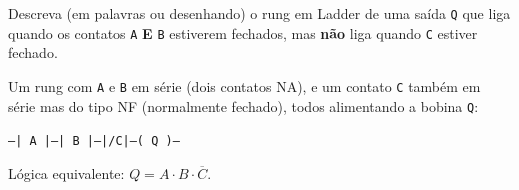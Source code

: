 \question[4] Descreva (em palavras ou desenhando) o rung em Ladder de uma saída \texttt{Q} que liga quando os contatos \texttt{A} \textbf{E} \texttt{B} estiverem fechados, mas \textbf{não} liga quando \texttt{C} estiver fechado.

\begin{solution}
Um rung com \texttt{A} e \texttt{B} em série (dois contatos NA), e um contato \texttt{C} também em série mas do tipo NF (normalmente fechado), todos alimentando a bobina \texttt{Q}:
\begin{center}
\texttt{---| A |---| B |---|/C|---( Q )---}
\end{center}
Lógica equivalente: $Q = A \cdot B \cdot \overline{C}$.
\end{solution}
